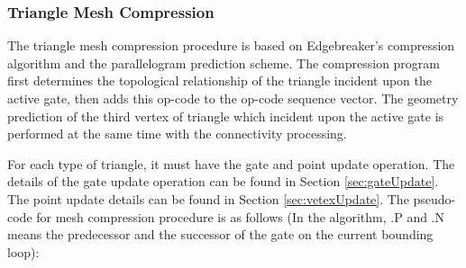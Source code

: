 \documentclass[onecolumn, 12pt]{article}
\begin{document}
\subsubsection{Triangle Mesh Compression}
The triangle mesh compression procedure is based on Edgebreaker's compression algorithm and the parallelogram prediction scheme. The compression program first determines the topological relationship of the triangle incident upon the active gate, then adds this op-code to the op-code sequence vector. The geometry prediction of the third vertex of triangle which incident upon the active gate is performed at the same time with the connectivity processing.

For each type of triangle, it must have the gate and point update operation. The details of the gate update operation can be found in Section \ref{sec:gateUpdate}. The point update details can be found in Section \ref{sec:vetexUpdate}. The pseudo-code for mesh compression procedure is as follows (In the algorithm, .P and .N means the predecessor and the successor of the gate on the current bounding loop):
\end{document}
